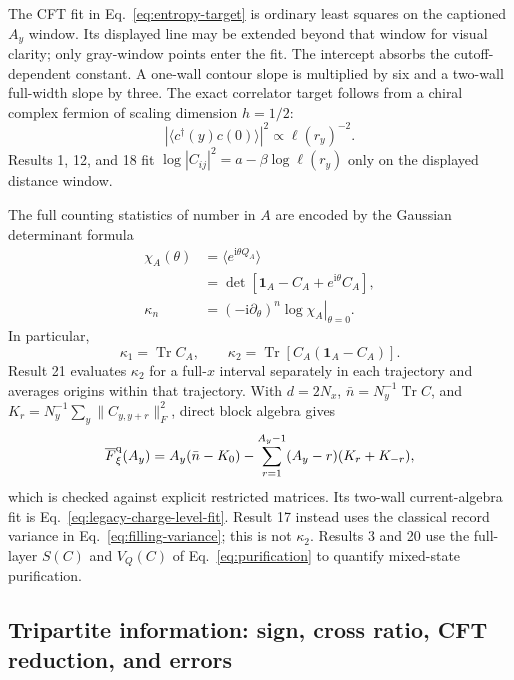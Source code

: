 \documentclass[aps,prb,twocolumn,floatfix,nofootinbib,superscriptaddress]{revtex4-2}
\newcommand{\Tr}{\operatorname{Tr}}
\newcommand{\ii}{\mathrm{i}}
\begin{document}
The CFT fit in Eq.~\eqref{eq:entropy-target} is ordinary least squares on the captioned
$A_y$ window.  Its displayed line may be extended beyond that window for visual clarity;
only gray-window points enter the fit.  The intercept absorbs the cutoff-dependent
constant.  A one-wall contour slope is multiplied by six and a two-wall full-width slope
by three.  The exact correlator target follows from a chiral complex fermion of scaling
dimension $h=1/2$:
\begin{equation}
 |\langle c^\dagger(y)c(0)\rangle|^2\propto\ell(r_y)^{-2}.
 \label{eq:atlas-correlator-target}
\end{equation}
Results 1, 12, and 18 fit
$\log|C_{ij}|^2=a-\beta\log\ell(r_y)$ only on the displayed distance window.

The full counting statistics of number in $A$ are encoded by the Gaussian determinant
formula~\cite{Klich2003}
\begin{equation}
 \begin{aligned}
 \chi_A(\theta)
 &=\langle e^{\ii\theta Q_A}\rangle\\
 &=\det\!\left[\mathbf{1}_A-C_A+e^{\ii\theta}C_A\right],\\
 \kappa_n&=\left.(-\ii\partial_\theta)^n\log\chi_A\right|_{\theta=0}.
 \end{aligned}
 \label{eq:atlas-fcs}
\end{equation}
In particular,
\begin{equation}
 \kappa_1=\Tr C_A,\qquad
 \kappa_2=\Tr[C_A(\mathbf{1}_A-C_A)].
 \label{eq:atlas-charge-cumulants}
\end{equation}
Result 21 evaluates $\kappa_2$ for a full-$x$ interval separately in each trajectory and
averages origins within that trajectory.  With $d=2N_x$,
$\bar n=N_y^{-1}\Tr C$, and
$K_r=N_y^{-1}\sum_y\|C_{y,y+r}\|_F^2$, direct block algebra gives
\begin{equation}
 \overline F_\xi^{\rm q}(A_y)
 =A_y(\bar n-K_0)
 -\sum_{r=1}^{A_y-1}(A_y-r)(K_r+K_{-r}),
 \label{eq:atlas-charge-origin-reduction}
\end{equation}
which is checked against explicit restricted matrices.  Its two-wall current-algebra fit
is Eq.~\eqref{eq:legacy-charge-level-fit}.  Result 17 instead uses the classical
record variance in Eq.~\eqref{eq:filling-variance}; this is not $\kappa_2$.
Results 3 and 20 use the full-layer $S(C)$ and $V_Q(C)$ of
Eq.~\eqref{eq:purification} to quantify mixed-state purification.

\subsection{Tripartite information: sign, cross ratio, CFT reduction, and errors}
\label{app:tmi-formalism}
\end{document}
